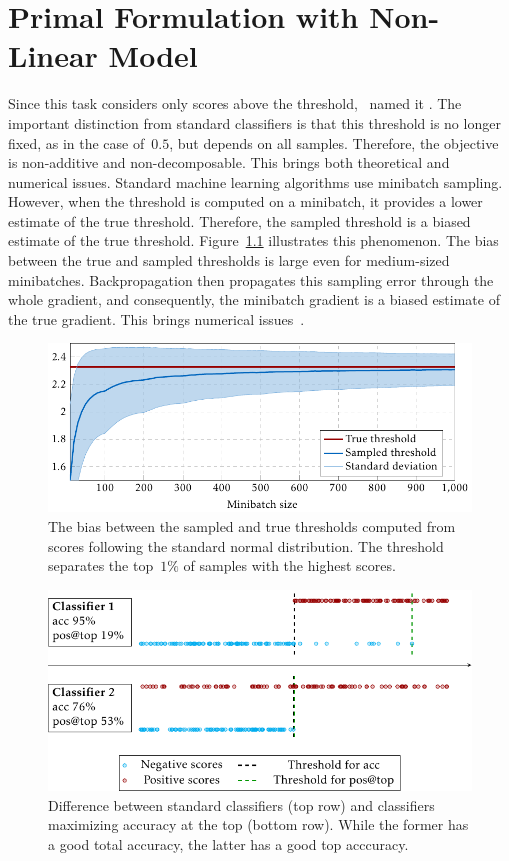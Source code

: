 \chapter{Primal Formulation with Non-Linear Model}\label{chap: deep}

Since this task considers only scores above the threshold,~\cite{boyd2012accuracy} named it \AccatTop. The important distinction from standard classifiers is that this threshold is no longer fixed, as in the case of~$0.5$, but depends on all samples. Therefore, the objective is non-additive and non-decomposable. This brings both theoretical and numerical issues. Standard machine learning algorithms use minibatch sampling. However, when the threshold is computed on a minibatch, it provides a lower estimate of the true threshold. Therefore, the sampled threshold is a biased estimate of the true threshold. Figure~\ref{fig:thresholds1} illustrates this phenomenon. The bias between the true and sampled thresholds is large even for medium-sized minibatches. Backpropagation then propagates this sampling error through the whole gradient, and consequently, the minibatch gradient is a biased estimate of the true gradient. This brings numerical issues~\cite{bottou2018optimization}.

\begin{figure}[!ht]
  \centering
  \includegraphics[width = \linewidth]{images/deep_threshold_bias.pdf}
  \caption{The bias between the sampled and true thresholds computed from scores following the standard normal distribution. The threshold separates the top~$1\%$ of samples with the highest scores.}
  \label{fig:thresholds1}
\end{figure}

\begin{figure}[!ht]
  \centering
  \includegraphics[width = \linewidth]{images/standard_aatp_comparison.pdf}
  \caption{Difference between standard classifiers (top row) and classifiers maximizing accuracy at the top (bottom row). While the former has a good total accuracy, the latter has a good top acccuracy.}
  \label{fig:difference}
\end{figure}

